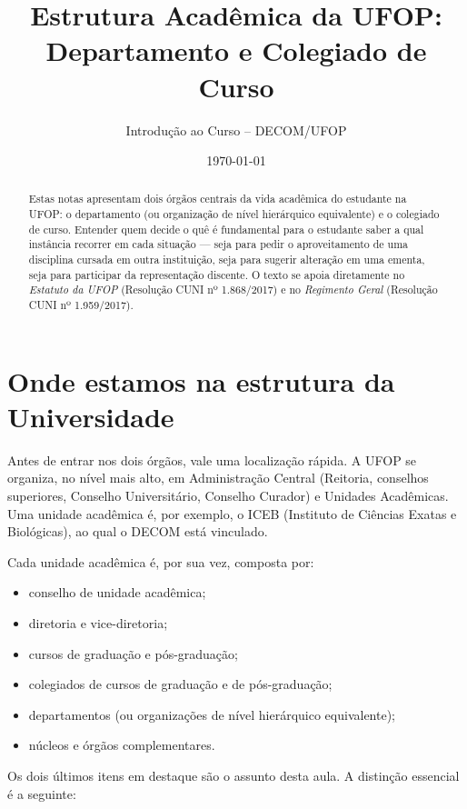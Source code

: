 \documentclass[10pt,a4paper]{extarticle}
\title{Estrutura Acadêmica da UFOP: Departamento e Colegiado de Curso}
\author{Introdução ao Curso -- DECOM/UFOP}
\date{\today}
\newcommand{\impt}[1]{\textcolor{important}{#1}}
\begin{document}
\maketitle

\begin{abstract}
\noindent Estas notas apresentam dois órgãos centrais da vida acadêmica do estudante na UFOP: o \impt{departamento} (ou organização de nível hierárquico equivalente) e o \impt{colegiado de curso}. Entender quem decide o quê é fundamental para o estudante saber a qual instância recorrer em cada situação --- seja para pedir o aproveitamento de uma disciplina cursada em outra instituição, seja para sugerir alteração em uma ementa, seja para participar da representação discente. O texto se apoia diretamente no \emph{Estatuto da UFOP} (Resolução CUNI nº 1.868/2017) e no \emph{Regimento Geral} (Resolução CUNI nº 1.959/2017).
\end{abstract}

\tableofcontents
\vspace{0.5cm}

\section{Onde estamos na estrutura da Universidade}

Antes de entrar nos dois órgãos, vale uma localização rápida. A UFOP se organiza, no nível mais alto, em \impt{Administração Central} (Reitoria, conselhos superiores, Conselho Universitário, Conselho Curador) e \impt{Unidades Acadêmicas}. Uma unidade acadêmica é, por exemplo, o ICEB (Instituto de Ciências Exatas e Biológicas), ao qual o DECOM está vinculado.

Cada unidade acadêmica é, por sua vez, composta por:

\begin{itemize}
    \item conselho de unidade acadêmica;
    \item diretoria e vice-diretoria;
    \item cursos de graduação e pós-graduação;
    \item \impt{colegiados de cursos} de graduação e de pós-graduação;
    \item \impt{departamentos} (ou organizações de nível hierárquico equivalente);
    \item núcleos e órgãos complementares.
\end{itemize}

Os dois últimos itens em destaque são o assunto desta aula. A distinção essencial é a seguinte:
\end{document}
